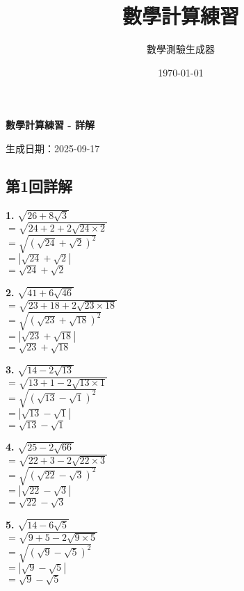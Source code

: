 \documentclass[a4paper,11pt]{article}
\title{\huge 數學計算練習}
\author{\large 數學測驗生成器}
\date{\large \today}
\renewcommand{\Large}{\fontsize{16pt}{20pt}\selectfont}
\newcommand{\explanationbox}[2][]{%
  \begin{tcolorbox}[explanationstyle, #1]
    #2
  \end{tcolorbox}
}
\begin{document}
\begin{center}
{\Large \textbf{數學計算練習 - 詳解}}
\end{center}

\noindent 生成日期：2025-09-17\hfill

\subsection*{第1回詳解}

\begin{multicols}{2}
\explanationbox{\textbf{1.} $\sqrt{26 + 8\sqrt{3}}$\\[0.3em]$= \sqrt{24+2 + 2\sqrt{24 \times 2}}$\\[0.3em]$= \sqrt{(\sqrt{24} + \sqrt{2})^2}$\\[0.3em]$= |\sqrt{24} + \sqrt{2}|$\\[0.3em]$= \sqrt{24} + \sqrt{2}$}

\explanationbox{\textbf{2.} $\sqrt{41 + 6\sqrt{46}}$\\[0.3em]$= \sqrt{23+18 + 2\sqrt{23 \times 18}}$\\[0.3em]$= \sqrt{(\sqrt{23} + \sqrt{18})^2}$\\[0.3em]$= |\sqrt{23} + \sqrt{18}|$\\[0.3em]$= \sqrt{23} + \sqrt{18}$}

\explanationbox{\textbf{3.} $\sqrt{14 - 2\sqrt{13}}$\\[0.3em]$= \sqrt{13+1 - 2\sqrt{13 \times 1}}$\\[0.3em]$= \sqrt{(\sqrt{13} - \sqrt{1})^2}$\\[0.3em]$= |\sqrt{13} - \sqrt{1}|$\\[0.3em]$= \sqrt{13} - \sqrt{1}$}

\explanationbox{\textbf{4.} $\sqrt{25 - 2\sqrt{66}}$\\[0.3em]$= \sqrt{22+3 - 2\sqrt{22 \times 3}}$\\[0.3em]$= \sqrt{(\sqrt{22} - \sqrt{3})^2}$\\[0.3em]$= |\sqrt{22} - \sqrt{3}|$\\[0.3em]$= \sqrt{22} - \sqrt{3}$}

\explanationbox{\textbf{5.} $\sqrt{14 - 6\sqrt{5}}$\\[0.3em]$= \sqrt{9+5 - 2\sqrt{9 \times 5}}$\\[0.3em]$= \sqrt{(\sqrt{9} - \sqrt{5})^2}$\\[0.3em]$= |\sqrt{9} - \sqrt{5}|$\\[0.3em]$= \sqrt{9} - \sqrt{5}$}


\end{multicols}
\end{document}

